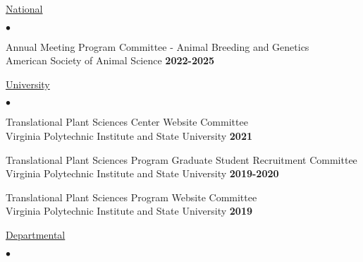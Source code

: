 \documentclass[margin,line,10pt]{res}
\newenvironment{list2}{
  \begin{list}{$\bullet$}{%
      \setlength{\itemsep}{0in}
      \setlength{\parsep}{0in} \setlength{\parskip}{0in}
      \setlength{\topsep}{0in} \setlength{\partopsep}{0in} 
      \setlength{\leftmargin}{0.2in}}}{\end{list}}
\begin{document}
\begin{resume}


\begin{flushleft}
  \hspace{0.3cm} \underline{National}
\end{flushleft}
\begin{list2}
\item Annual Meeting Program Committee - Animal Breeding and Genetics   \\
American Society of Animal Science   \hfill \textbf{2022-2025}\\

\end{list2}


\begin{flushleft}
  \hspace{0.3cm} \underline{University}
\end{flushleft}
\begin{list2}
\item Translational Plant Sciences Center Website Committee \\
  Virginia Polytechnic Institute and State University  \hfill \textbf{2021}\\

  \vspace{0.3cm}


  \item Translational Plant Sciences Program Graduate Student Recruitment Committee \\
  Virginia Polytechnic Institute and State University  \hfill \textbf{2019-2020}\\

  \vspace{0.3cm}
  
\item Translational Plant Sciences Program Website Committee \\
  Virginia Polytechnic Institute and State University  \hfill \textbf{2019}\\

  
\end{list2}

  
\begin{flushleft}
  \hspace{0.3cm} \underline{Departmental}
\end{flushleft}
\begin{list2}


\end{list2}
\end{resume}
\end{document}
